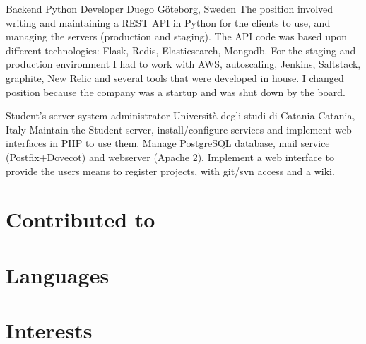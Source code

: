 \documentclass[11pt,a4paper,sans]{moderncv} %
\begin{document}
    {Backend Python Developer}
    {Duego}
    {G\"{o}teborg, Sweden}
    {}
    {
        The position involved writing and maintaining a REST API in Python for the clients to use, and managing the servers (production and staging).
        \newline
        The API code was based upon different technologies: Flask, Redis, Elasticsearch, Mongodb.
        \newline
        For the staging and production environment I had to work with AWS, autoscaling, Jenkins, Saltstack, graphite, New Relic and several tools that were developed in house.
        \newline
        I changed position because the company was a startup and was shut down by the board.
    }

    {Student's server system administrator}
    {Universit\`{a} degli studi di Catania}
    {Catania, Italy}
    {}
    {Maintain the Student server, install/configure services and implement web interfaces in PHP to use them.
    \newline
    Manage PostgreSQL database, mail service (Postfix+Dovecot) and webserver (Apache 2).
    \newline
    Implement a web interface to provide the users means to register projects, with git/svn access and a wiki.
    }



\section{Contributed to}

\section{Languages}



\section{Interests}
\end{document}
